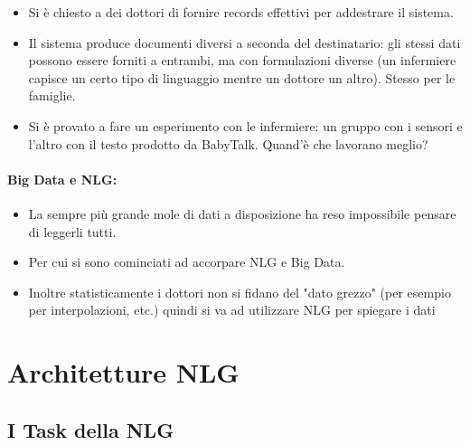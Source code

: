 \begin{itemize}
  \item Si è chiesto a dei dottori di fornire records effettivi per addestrare il sistema. 
  \item Il sistema produce documenti diversi a seconda del destinatario: gli stessi dati possono essere forniti a entrambi, ma con formulazioni diverse (un infermiere capisce un certo tipo di linguaggio mentre un dottore un altro). Stesso per le famiglie.
  \item Si è provato a fare un esperimento con le infermiere: un gruppo con i sensori e l'altro con il testo prodotto da BabyTalk. Quand'è che lavorano meglio?
\end{itemize}

\paragraph{Big Data e NLG:} 

\begin{itemize}
  \item La sempre più grande mole di dati a disposizione ha reso impossibile pensare di leggerli tutti. 
  \item Per cui si sono cominciati ad accorpare NLG e Big Data. 
  \item Inoltre statisticamente i dottori non si fidano del "dato grezzo" (per esempio per interpolazioni, etc.) quindi si va ad utilizzare NLG per spiegare i dati
\end{itemize}

\section{Architetture NLG}

\subsection{I Task della NLG}


